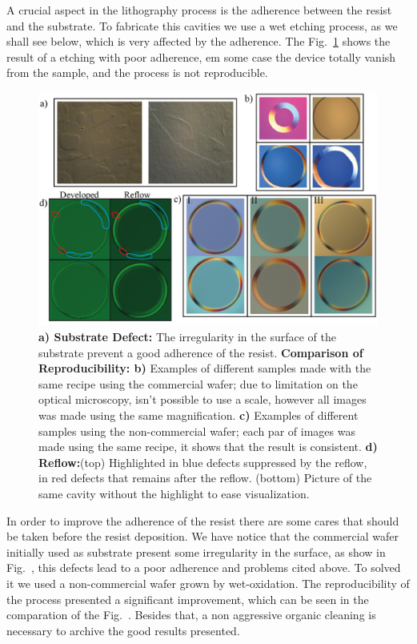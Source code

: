 A crucial aspect in the lithography process is the adherence between the resist and the substrate. To fabricate this cavities we use a wet etching process, as we shall see below, which is very affected by the adherence. The Fig.~\ref{fig:adhrence_problem} 
shows the result of a etching with poor adherence, em some case the device totally vanish from the sample, and the process is not reproducible.
\begin{figure}[!hbt]
    \centering
    \includegraphics[width = 16cm]{figuras/Dissertation_etching_result.jpg}
    \caption{\textbf{a) Substrate Defect:} The irregularity in the surface of the substrate prevent a good adherence of the resist. \textbf{Comparison of Reproducibility: b)} Examples of different samples made with the same recipe using the commercial wafer; due to limitation on the optical microscopy, isn't possible to use a scale, however all images was made using the same magnification. \textbf{c)} Examples of different samples using the non-commercial wafer; each par of images was made using the same recipe, it shows that the result is consistent. \textbf{d) Reflow:}(top) Highlighted in blue defects suppressed by the reflow, in red defects that remains after the reflow. (bottom) Picture of the same cavity without the highlight to ease visualization.}
    \label{fig:adhrence_problem}
\end{figure}

In order to improve the adherence of the resist there are some cares that should be taken before the resist deposition. We have notice that the commercial wafer initially used as substrate present some irregularity in the surface, as show in Fig.~, this defects lead to a poor adherence and problems cited above. To solved it we used a non-commercial wafer grown by wet-oxidation. The reproducibility of the process presented a significant improvement, which can be seen in the comparation of the Fig.~. Besides that, a non aggressive organic cleaning is necessary to archive the good results presented.


